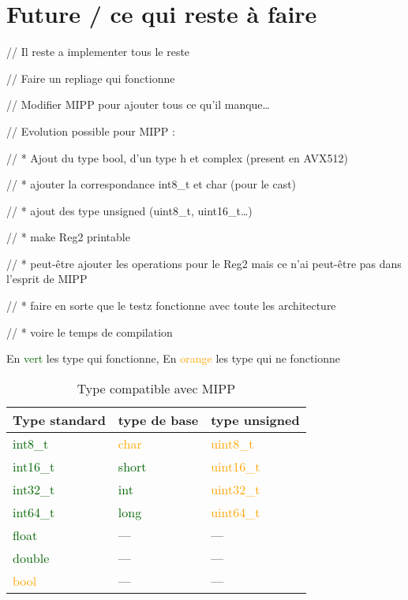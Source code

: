 \section{Future / ce qui reste à faire}

//  Il reste a implementer tous le reste

//  Faire un repliage qui fonctionne

//  Modifier MIPP pour ajouter tous ce qu'il manque\dots

// Evolution possible pour MIPP :

// * Ajout du type bool, d'un type h  et complex (present en AVX512)

// * ajouter la correspondance int8\_t et char (pour le cast)

// * ajout des type unsigned (uint8\_t, uint16\_t\dots)

// * make Reg2 printable

// * peut-être ajouter les operations pour le Reg2 mais ce n'ai peut-être pas dans
l'esprit de MIPP

// * faire en sorte que le testz fonctionne avec toute les architecture

// * voire le temps de compilation

\begin{table}[H]
  \centering
  \caption*{En \textcolor{darkGreen}{vert} les type qui fonctionne, En \textcolor{orange}{orange}
    les type qui ne fonctionne}
  \begin{tabular}[H]{|m{.21\linewidth}|m{.18\linewidth}|m{.21\linewidth}|}
    \hline
    \textbf{Type standard}          & \textbf{type de base}        & \textbf{type unsigned}        \\
    \hline
    \textcolor{darkGreen}{int8\_t}  & \textcolor{orange}{char}     & \textcolor{orange}{uint8\_t}  \\
    \hline
    \textcolor{darkGreen}{int16\_t} & \textcolor{darkGreen}{short} & \textcolor{orange}{uint16\_t} \\
    \hline
    \textcolor{darkGreen}{int32\_t} & \textcolor{darkGreen}{int}   & \textcolor{orange}{uint32\_t} \\
    \hline
    \textcolor{darkGreen}{int64\_t} & \textcolor{darkGreen}{long}  & \textcolor{orange}{uint64\_t} \\
    \hline
    \textcolor{darkGreen}{float}    & \----                        & \----                         \\
    \hline
    \textcolor{darkGreen}{double}   & \----                        & \----                         \\
    \hline
    \textcolor{orange}{bool}        & \----                        & \----                         \\
    \hline
  \end{tabular}
  \caption{Type compatible avec MIPP}
\end{table}
